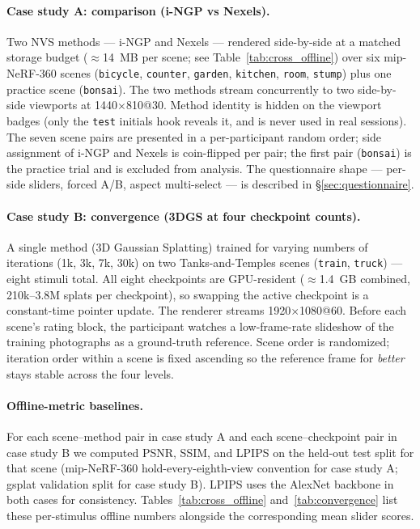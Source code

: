 \paragraph{Case study A: comparison (i-NGP vs Nexels).}
Two NVS methods --- i-NGP and Nexels --- rendered side-by-side at a
matched storage budget ($\approx$14~MB per scene; see
Table~\ref{tab:cross_offline}) over six mip-NeRF-360 scenes
(\texttt{bicycle}, \texttt{counter}, \texttt{garden}, \texttt{kitchen},
\texttt{room}, \texttt{stump}) plus one practice scene
(\texttt{bonsai}). The two methods stream concurrently to two
side-by-side viewports at 1440$\times$810@30. Method identity is
hidden on the viewport badges (only the \texttt{test} initials hook
reveals it, and is never used in real sessions). The seven scene pairs
are presented in a per-participant random order; side assignment of
i-NGP and Nexels is coin-flipped per pair; the first pair
(\texttt{bonsai}) is the practice trial and is excluded from analysis.
The questionnaire shape --- per-side sliders, forced A/B, aspect
multi-select --- is described in \S\ref{sec:questionnaire}.

\paragraph{Case study B: convergence (3DGS at four checkpoint counts).}
A single method (3D Gaussian Splatting) trained for varying numbers of
iterations (1k, 3k, 7k, 30k) on two Tanks-and-Temples scenes
(\texttt{train}, \texttt{truck}) --- eight stimuli total. All eight
checkpoints are GPU-resident ($\approx$1.4~GB combined, 210k--3.8M
splats per checkpoint), so swapping the active checkpoint is a
constant-time pointer update. The renderer streams 1920$\times$1080@60.
Before each scene's rating block, the participant watches a
low-frame-rate slideshow of the training photographs as a
ground-truth reference. Scene order is randomized; iteration order
within a scene is fixed ascending so the reference frame for
\emph{better} stays stable across the four levels.

\paragraph{Offline-metric baselines.}
For each scene--method pair in case study A and each
scene--checkpoint pair in case study B we computed PSNR, SSIM, and
LPIPS on the held-out test split for that scene (mip-NeRF-360
hold-every-eighth-view convention for case study A; gsplat
validation split for case study B). LPIPS uses the AlexNet backbone in
both cases for consistency. Tables~\ref{tab:cross_offline}
and~\ref{tab:convergence} list these per-stimulus offline numbers
alongside the corresponding mean slider scores.

